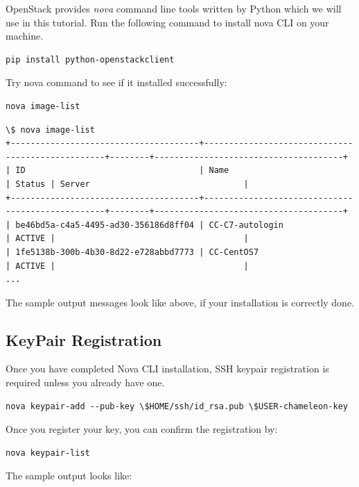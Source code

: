 OpenStack provides \textit{nova} command line tools written by Python which we
will use in this tutorial. Run the following command to install nova CLI on
your machine.

\begin{lstlisting}
pip install python-openstackclient
\end{lstlisting}

Try nova command to see if it installed successfully:

\begin{lstlisting}
nova image-list
\end{lstlisting}

\begin{lstlisting}
\$ nova image-list
+--------------------------------------+--------------------------------------------------+--------+--------------------------------------+
| ID                                   | Name                                             | Status | Server                               |
+--------------------------------------+--------------------------------------------------+--------+--------------------------------------+
| be46bd5a-c4a5-4495-ad30-356186d8ff04 | CC-C7-autologin                                  | ACTIVE |                                      |
| 1fe5138b-300b-4b30-8d22-e728abbd7773 | CC-CentOS7                                       | ACTIVE |                                      |
...
\end{lstlisting}

The sample output messages look like above, if your installation is correctly
done.

\subsection{KeyPair Registration}

Once you have completed Nova CLI installation, SSH keypair registration is
required unless you already have one.

\begin{lstlisting}
nova keypair-add --pub-key \$HOME/ssh/id_rsa.pub \$USER-chameleon-key
\end{lstlisting}

Once you register your key, you can confirm the registration by:

\begin{lstlisting}
nova keypair-list
\end{lstlisting}

The sample output looks like:


